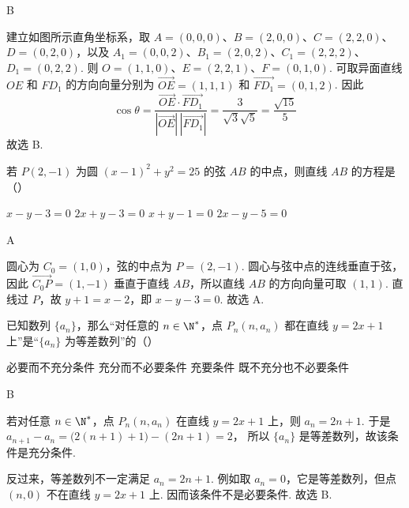 \begin{answer}
B
\end{answer}

\begin{solution}
建立如图所示直角坐标系，取
\(A=(0,0,0)\)、\(B=(2,0,0)\)、\(C=(2,2,0)\)、\(D=(0,2,0)\)，以及
\(A_1=(0,0,2)\)、\(B_1=(2,0,2)\)、\(C_1=(2,2,2)\)、\(D_1=(0,2,2)\). 则
\(O=(1,1,0)\)、\(E=(2,2,1)\)、\(F=(0,1,0)\).
可取异面直线 \(OE\) 和 \(FD_1\) 的方向向量分别为
\(\overrightarrow{OE}=(1,1,1)\) 和 \(\overrightarrow{FD_1}=(0,1,2)\). 因此
\[
\cos\theta
=\frac{\overrightarrow{OE}\cdot\overrightarrow{FD_1}}{|\overrightarrow{OE}|\,|\overrightarrow{FD_1}|}
=\frac{3}{\sqrt3\sqrt5}=\frac{\sqrt{15}}5
\]
故选 B.
\end{solution}

\begin{problem}
若 \(P(2, -1)\) 为圆 \((x - 1)^2 + y^2 = 25\) 的弦 \(AB\) 的中点，则直线 \(AB\) 的方程是（\quad）

\choices
    {\(x - y - 3 = 0\)}
    {\(2x + y - 3 = 0\)}
    {\(x + y - 1 = 0\)}
    {\(2x - y - 5 = 0\)}
\end{problem}

\begin{answer}
A
\end{answer}

\begin{solution}
圆心为 \(C_0=(1,0)\)，弦的中点为 \(P=(2,-1)\). 圆心与弦中点的连线垂直于弦，因此 \(\overrightarrow{C_0P}=(1,-1)\) 垂直于直线 \(AB\)，所以直线 \(AB\) 的方向向量可取 \((1,1)\). 直线过 \(P\)，故 \(y+1=x-2\)，即 \(x-y-3=0\).
故选 A.
\end{solution}

\begin{problem}
已知数列 \(\{a_{n}\}\)，那么“对任意的 \(n \in \N^{*}\)，点 \(P_{n}(n, a_{n})\) 都在直线 \(y = 2x + 1\) 上”是“\(\{a_{n}\}\) 为等差数列”的（\quad）

\choices
    {必要而不充分条件}
    {充分而不必要条件}
    {充要条件}
    {既不充分也不必要条件}
\end{problem}

\begin{answer}
B
\end{answer}

\begin{solution}
若对任意 \(n\in\N^*\)，点 \(P_n(n,a_n)\) 在直线 \(y=2x+1\) 上，则 \(a_n=2n+1\). 于是 \(a_{n+1}-a_n=\bigl(2(n+1)+1\bigr)-(2n+1)=2\)，
所以 \(\{a_n\}\) 是等差数列，故该条件是充分条件.

反过来，等差数列不一定满足 \(a_n=2n+1\). 例如取 \(a_n=0\)，它是等差数列，但点 \((n,0)\) 不在直线 \(y=2x+1\) 上. 因而该条件不是必要条件.
故选 B.
\end{solution}


